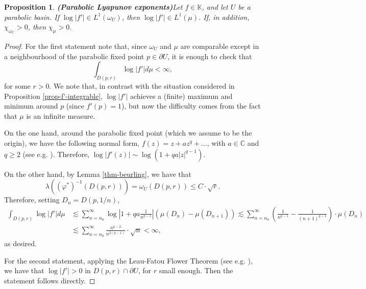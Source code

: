 \documentclass[11pt]{article}
\newtheorem{prop}[thm]{Proposition}
\theoremstyle{definition}
\theoremstyle{remark}
\theoremstyle{plain}
\begin{document}
\begin{prop}{\bf (Parabolic Lyapunov exponents)}\label{prop-log-int-parabolic-basins}
	Let $ f\in\mathbb{K} $, and let $ U $ be a parabolic basin. If $ \log \left| f'\right| \in L^1(\omega_U) $, then $ \log \left| f'\right| \in L^1(\mu) $. If, in addition, $ \chi_{\omega_U}> 0 $, then $ \chi_{\mu}>0 $.
\end{prop}
\begin{proof}
	For the first statement note that, since $ \omega_U $ and $ \mu $ are comparable except in a neighbourhood of the parabolic fixed point $ p\in\partial U $, it is enough to check that 
	\[\int_{D(p,r)}\log \left| f'\right| d\mu<\infty,\] for some $ r>0 $. We note that, in contrast with the situation considered in Proposition \ref{prop-f'-integrable}, $  \log \left| f'\right| $ achieves a (finite) maximum and minimum around $ p $  (since $ f'(p)=1 $), but now the difficulty comes from the fact that $ \mu $ is an infinite measure.

	On the one hand,  around the parabolic fixed point (which we assume to be the origin), we have the following normal form,    
	$f(z)=z+az^q+\dots$, with $ a\in\mathbb{C} $ and $ q\geq 2 $ (see e.g. \cite[Sect. 10]{milnor}). Therefore, 
	$\log \left| f'(z)\right| \sim \log (1+qa\left| z\right|^{q-1})$.
	
	
	On the other hand, by Lemma \ref{thm-beurling}, we have that 
	\[\lambda ((\varphi^*)^{-1}(D(p,r)))=\omega_U(D(p,r))\leq C\cdot\sqrt r.\] 
	Therefore, setting $ D_n=D(p, 1/n) $, \begin{align*}
		\int_{D(p,r)}\log \left| f'\right| d\mu&\lesssim \sum_{n=n_0}^\infty\log\left| 1+qa \frac{1}{n^{q-1}}\right|( \mu(D_n)-\mu(D_{n+1}))
		\lesssim \sum_{n=n_0}^\infty\left( \frac{1}{n ^{q-1}}-\frac{1}{{(n+1)}^{q-1}}\right)  \cdot \mu(D_n)\\&\lesssim  \sum_{n=n_0}^\infty\frac{n^{q-2}}{n^{2(q-1)}}\cdot \sqrt n<\infty,
	\end{align*}
	as desired.
	
	For the second statement, applying the Leau-Fatou Flower Theorem (see e.g. \cite[Sect. 10]{milnor}), we have that $ \log \left| f'\right| >0 $ in $ D(p,r)\cap \partial U $, for $ r $ small enough. Then the statement follows directly.
\end{proof}
\end{document}
